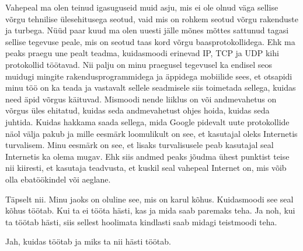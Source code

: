 Vahepeal ma olen teinud igasuguseid muid asju, mis ei ole olnud väga sellise 
võrgu tehnilise ülesehitusega seotud, vaid mis on rohkem seotud võrgu 
rakenduste ja turbega. Nüüd paar kuud ma olen uuesti jälle mõnes mõttes 
sattunud tagasi sellise tegevuse peale, mis on seotud taas kord võrgu 
baasprotokollidega. Ehk  ma peaks praegu une pealt teadma, kuidasmoodi erinevad 
IP,  TCP  ja UDP kihi protokollid töötavad. Nii palju on minu praegusel 
tegevusel ka endisel seos muidugi mingite rakendusprogrammidega ja äppidega  
mobiilide sees, et otsapidi minu töö on ka teada ja vastavalt sellele 
seadmisele siis toimetada sellega, kuidas need äpid võrgus käituvad. Mismoodi 
nende liiklus on või  andmevahetus on võrgus üles ehitatud, kuidas seda 
andmevahetust ohjes hoida, kuidas seda juhtida. Kuidas hakkama saada sellega, 
mida Google pidevalt uute protokollide näol välja pakub ja mille eesmärk 
loomulikult on see, et kasutajal oleks Internetis turvalisem. Minu eesmärk on 
see, et lisaks turvalisusele peab kasutajal seal Internetis ka olema mugav. Ehk 
siis andmed peaks jõudma ühest punktist teise nii kiiresti, et kasutaja 
teadvusta, et  kuskil seal vahepeal Internet on, mis võib olla ebatöökindel või 
aeglane.


Täpselt nii. Minu jaoks on oluline see, mis on karul kõhus. Kuidasmoodi see 
seal kõhus töötab. Kui ta ei tööta hästi, kas ja mida  saab paremaks teha. Ja 
noh, kui ta töötab hästi, siis  sellest hoolimata kindlasti saab midagi 
teistmoodi teha.


Jah, kuidas töötab ja miks  ta nii hästi töötab.

